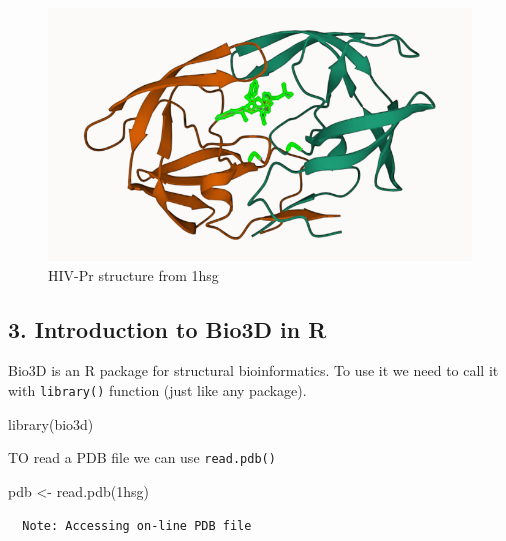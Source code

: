 \documentclass[
  letterpaper,
  DIV=11,
  numbers=noendperiod]{scrartcl}
\newenvironment{Shaded}{\begin{snugshade}}{\end{snugshade}}
\newcommand{\FunctionTok}[1]{\textcolor[rgb]{0.28,0.35,0.67}{#1}}
\newcommand{\NormalTok}[1]{\textcolor[rgb]{0.00,0.23,0.31}{#1}}
\newcommand{\OtherTok}[1]{\textcolor[rgb]{0.00,0.23,0.31}{#1}}
\newcommand{\StringTok}[1]{\textcolor[rgb]{0.13,0.47,0.30}{#1}}
\begin{document}
\begin{figure}

{\centering \includegraphics{1HSG.png}

}

\caption{HIV-Pr structure from 1hsg}

\end{figure}

\hypertarget{introduction-to-bio3d-in-r}{%
\subsection{3. Introduction to Bio3D in
R}\label{introduction-to-bio3d-in-r}}

Bio3D is an R package for structural bioinformatics. To use it we need
to call it with \texttt{library()} function (just like any package).

\begin{Shaded}
\begin{Highlighting}[]
\FunctionTok{library}\NormalTok{(}\StringTok{\textquotesingle{}bio3d\textquotesingle{}}\NormalTok{)}
\end{Highlighting}
\end{Shaded}

TO read a PDB file we can use \texttt{read.pdb()}

\begin{Shaded}
\begin{Highlighting}[]
\NormalTok{pdb }\OtherTok{\textless{}{-}} \FunctionTok{read.pdb}\NormalTok{(}\StringTok{\textquotesingle{}1hsg\textquotesingle{}}\NormalTok{)}
\end{Highlighting}
\end{Shaded}

\begin{verbatim}
  Note: Accessing on-line PDB file
\end{verbatim}
\end{document}
